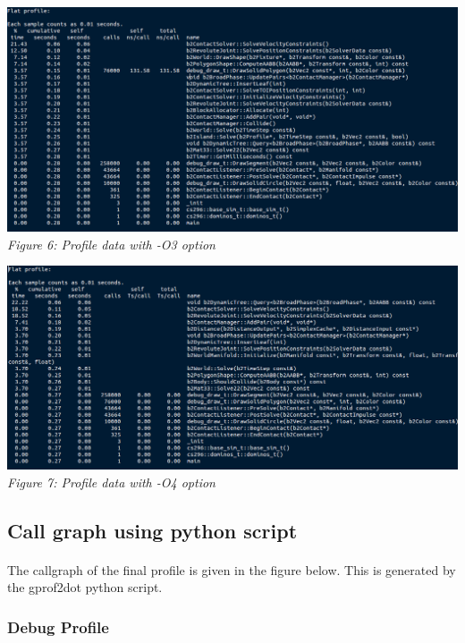 \documentclass[11pt]{article}
\begin{document}
\begin{center}
 \includegraphics[scale = 0.35]{images/o3} \\
  \emph{Figure 6: Profile data with -O3 option} \\
\end{center}

\begin{center}
 \includegraphics[scale = 0.35]{images/o4} \\
  \emph{Figure 7: Profile data with -O4 option} \\
\end{center}



\subsection{Call graph using python script}
\paragraph{}
The callgraph of the final profile is given in the figure below. This is generated by the gprof2dot python script\cite{jos}.
\subsubsection{Debug Profile}
\end{document}
